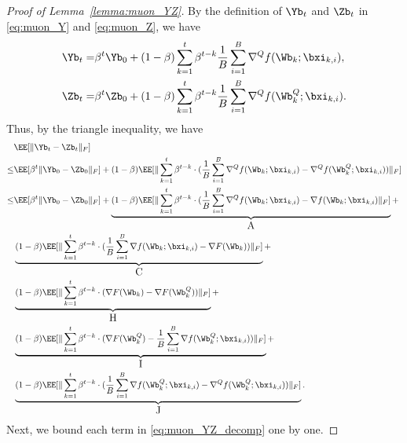\documentclass[11pt, letterpaper]{article}
\begin{document}
\begin{proof}[Proof of Lemma~\ref{lemma:muon_YZ}]
    By the definition of $\Yb_t$ and $\Zb_t$ in \eqref{eq:muon_Y} and \eqref{eq:muon_Z}, we have
    \begin{align*}
        \Yb_t =& \beta^t\Yb_0 + (1-\beta)\sum_{k=1}^t\beta^{t-k}\frac{1}{B}\sum_{i=1}^B\nabla^Q f(\Wb_k;\bxi_{k,i}) , \\
        \Zb_t =& \beta^t\Zb_0 + (1-\beta)\sum_{k=1}^t\beta^{t-k}\frac{1}{B}\sum_{i=1}^B\nabla^Q f(\Wb_k^Q;\bxi_{k,i}) .
    \end{align*}
    Thus, by the triangle inequality, we have
    \begin{align}\label{eq:muon_YZ_decomp}
        &\EE[\| \Yb_t - \Zb_t \|_F]\notag\\
        \le& \EE[\beta^t \| \Yb_{0} - \Zb_{0} \|_F] + (1-\beta)\EE[\|\sum_{k=1}^t\beta^{t-k}\cdot(\frac{1}{B}\sum_{i=1}^B   \nabla^Q f(\Wb_k;\bxi_{k,i}) - \nabla^Q f(\Wb_k^Q;\bxi_{k,i}) ) \|_F] \notag \\
        \le& \EE[\beta^t \| \Yb_{0} - \Zb_{0} \|_F] + \underbrace{(1-\beta)\EE[\|\sum_{k=1}^t\beta^{t-k}\cdot(\frac{1}{B}\sum_{i=1}^B   \nabla^Q f(\Wb_k;\bxi_{k,i}) -\nabla f(\Wb_k;\bxi_{k,i}) \|_F]}_{\text{\large A}} + \notag \\
        & \underbrace{(1-\beta)\EE[\|\sum_{k=1}^t\beta^{t-k}\cdot(\frac{1}{B}\sum_{i=1}^B\nabla f(\Wb_k;\bxi_{k,i}) - \nabla F(\Wb_k))\|_F]}_{\text{\large C}} + \notag \\
        & \underbrace{(1-\beta)\EE[\|\sum_{k=1}^t\beta^{t-k}\cdot(\nabla F(\Wb_k) - \nabla F(\Wb_k^Q))\|_F]}_{\text{\large H}} + \notag \\
        & \underbrace{(1-\beta) \EE[\|\sum_{k=1}^t\beta^{t-k}\cdot(\nabla F(\Wb_k^Q) - \frac{1}{B}\sum_{i=1}^B\nabla f(\Wb_k^Q;\bxi_{k,i}) ) \|_F]}_{\text{\large I}} + \notag \\
        & \underbrace{(1-\beta) \EE[\|\sum_{k=1}^t\beta^{t-k}\cdot(\frac{1}{B}\sum_{i=1}^B\nabla f(\Wb_k^Q;\bxi_{k,i}) - \nabla^Q f(\Wb_k^Q;\bxi_{k,i}) ) \|_F]}_{\text{\large J}}.
    \end{align}
    Next, we bound each term in \eqref{eq:muon_YZ_decomp} one by one.


\end{proof}
\end{document}
